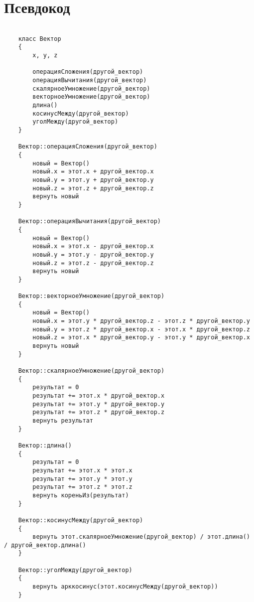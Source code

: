 \label{sec:pseudocode}
\section{Псевдокод}

{
    \fontsize{8pt}{10pt}\selectfont
    \begin{verbatim}

    класс Вектор
    {
        x, y, z

        операцияСложения(другой_вектор)
        операцияВычитания(другой_вектор)
        скалярноеУмножение(другой_вектор)
        векторноеУмножение(другой_вектор)
        длина()
        косинусМежду(другой_вектор)
        уголМежду(другой_вектор)
    }

    Вектор::операцияСложения(другой_вектор)
    {
        новый = Вектор()
        новый.x = этот.x + другой_вектор.x
        новый.y = этот.y + другой_вектор.y
        новый.z = этот.z + другой_вектор.z
        вернуть новый
    }

    Вектор::операцияВычитания(другой_вектор)
    {
        новый = Вектор()
        новый.x = этот.x - другой_вектор.x
        новый.y = этот.y - другой_вектор.y
        новый.z = этот.z - другой_вектор.z
        вернуть новый
    }

    Вектор::векторноеУмножение(другой_вектор)
    {
        новый = Вектор()
        новый.x = этот.y * другой_вектор.z - этот.z * другой_вектор.y
        новый.y = этот.z * другой_вектор.x - этот.x * другой_вектор.z
        новый.z = этот.x * другой_вектор.y - этот.y * другой_вектор.x
        вернуть новый
    }

    Вектор::скалярноеУмножение(другой_вектор)
    {
        результат = 0
        результат += этот.x * другой_вектор.x
        результат += этот.y * другой_вектор.y
        результат += этот.z * другой_вектор.z
        вернуть результат
    }

    Вектор::длина()
    {
        результат = 0
        результат += этот.x * этот.x
        результат += этот.y * этот.y
        результат += этот.z * этот.z
        вернуть кореньИз(результат)
    }

    Вектор::косинусМежду(другой_вектор)
    {
        вернуть этот.скалярноеУмножение(другой_вектор) / этот.длина() / другой_вектор.длина()
    }

    Вектор::уголМежду(другой_вектор)
    {
        вернуть арккосинус(этот.косинусМежду(другой_вектор))
    }

    \end{verbatim}
}